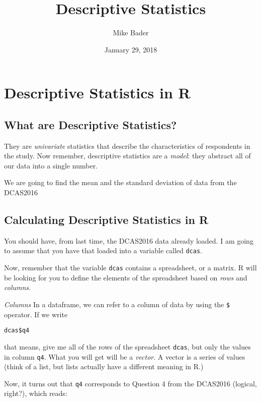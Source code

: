 \documentclass[]{article}
\title{Descriptive Statistics}
\author{Mike Bader}
\date{January 29, 2018}
\begin{document}
\maketitle

\section{Descriptive Statistics in R}\label{descriptive-statistics-in-r}

\subsection{What are Descriptive
Statistics?}\label{what-are-descriptive-statistics}

They are \emph{univariate} statistics that describe the characteristics
of respondents in the study. Now remember, descriptive statistics are a
\emph{model}: they abstract all of our data into a single number.

We are going to find the mean and the standard deviation of data from
the DCAS2016

\subsection{Calculating Descriptive Statistics in
R}\label{calculating-descriptive-statistics-in-r}

You should have, from last time, the DCAS2016 data already loaded. I am
going to assume that you have that loaded into a variable called
\texttt{dcas}.

Now, remember that the variable \texttt{dcas} contains a spreadsheet, or
a matrix. R will be looking for you to define the elements of the
spreadsheet based on \emph{rows} and \emph{columns}.

\emph{Columns} In a dataframe, we can refer to a column of data by using
the \texttt{\$} operator. If we write

\begin{verbatim}
dcas$q4
\end{verbatim}

that means, give me all of the rows of the spreadsheet {\texttt{dcas}},
but only the values in column {\texttt{q4}}. What you will get will be a
\emph{vector}. A vector is a series of values (think of a list, but
lists actually have a different meaning in R.)

Now, it turns out that \texttt{q4} corresponds to Question 4 from the
DCAS2016 (logical, right?), which reads:
\end{document}
